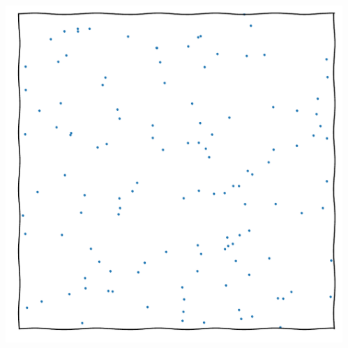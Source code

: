 \documentclass[aspectratio=169]{beamer}
\begin{document}
\begin{frame}
\begin{columns}
\begin{itemize}
        \end{itemize}
        \includegraphics[width=\textwidth,page=14]{figures/himmelblau}%
    \end{columns}
\end{frame}
\end{document}
